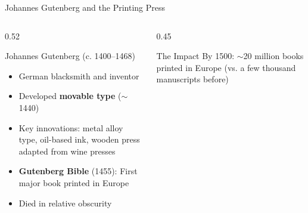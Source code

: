 \documentclass[aspectratio=169]{beamer}
\begin{document}
\begin{frame}{Johannes Gutenberg and the Printing Press}
\begin{columns}
\begin{column}{0.52\textwidth}
\begin{block}{Johannes Gutenberg (c. 1400--1468)}
\begin{itemize}
  \item German blacksmith and inventor
  \item Developed \textbf{movable type} ($\sim$1440)
  \item Key innovations: metal alloy type, oil-based ink, wooden press adapted from wine presses
  \item \textbf{Gutenberg Bible} (1455): First major book printed in Europe
  \item Died in relative obscurity
\end{itemize}
\end{block}
\end{column}

\begin{column}{0.45\textwidth}

\vspace{0.3em}
\begin{exampleblock}{The Impact}
By 1500: $\sim$20 million books printed in Europe (vs. a few thousand manuscripts before)
\end{exampleblock}
\end{column}
\end{columns}
\end{frame}
\end{document}
